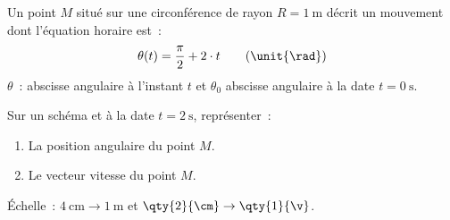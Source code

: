 Un point $M$ situé sur une circonférence de rayon $R=\qty{1}{\meter}$ décrit un
mouvement dont l'équation horaire est~:
\[
    \theta(t)=\frac{\pi}{2}+2 \cdot t \qquad (\unit{\rad})
\]
$\theta$~: abscisse angulaire à l'instant $t$ et $\theta_{0}$ abscisse
angulaire à la date $t=\qty{0}{\second}$.

Sur un schéma et à la date $t=\qty{2}{\second}$, représenter~:
\begin{enumerate}
    \item La position angulaire du point $M$.
    \item Le vecteur vitesse du point $M$.
\end{enumerate}
Échelle~: $\qty{4}{\cm} \to \qty{1}{\meter}$ et $\qty{2}{\cm} \to \qty{1}{\v}$.

